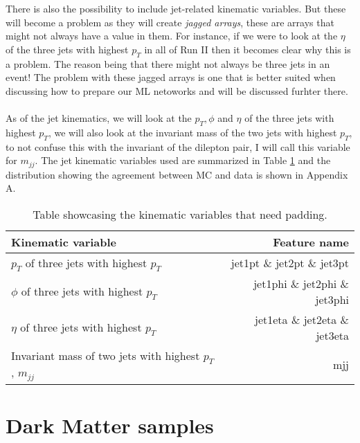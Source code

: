 \documentclass[14pt, a4paper]{book}
\begin{document}
\clearpage\noindent There is also the possibility to include jet-related kinematic variables. But these will become a problem as they will create \textit{jagged arrays}, these are arrays that might not always have a value in them.
For instance, if we were to look at the $\eta$ of the three jets with highest $p_T$ in all of Run II then it becomes clear why this is a problem. The reason being that there might not always be three jets in an event!
The problem with these jagged arrays is one that is better suited when discussing how to prepare our ML netoworks and will be discussed furhter there. \\
\\As of the jet kinematics, we will look at the $p_T, \phi$ and $\eta$ of the three jets with highest $p_T$, we will also look at the invariant mass of the two jets with highest $p_T$, 
to not confuse this with the invariant of the dilepton pair, I will call this variable for $m_{jj}$. The jet kinematic variables used are summarized in Table \ref{tab:paddable_variables} 
and the distribution showing the agreement between MC and data is shown in Appendix A.
\begin{table}[!h]
    \centering
    \begin{tabular}{l|r}\midrule\midrule
        Kinematic variable                                                      & Feature name          \\\midrule
        $p_T$ of three jets with highest $p_T$                                  & jet1pt \& jet2pt \& jet3pt\\
        $\phi$ of three jets with highest $p_T$                                 & jet1phi \& jet2phi \& jet3phi\\
        $\eta$ of three jets with highest $p_T$                                 & jet1eta \& jet2eta \& jet3eta\\
        Invariant mass of two jets with highest $p_T$, $m_{jj}$                 & mjj\\\midrule\midrule
    \end{tabular}
    \caption[Kinematic variables that need padding]{Table showcasing the kinematic variables that need padding.}
    \label{tab:paddable_variables}
\end{table}


\section{Dark Matter samples}
\end{document}
